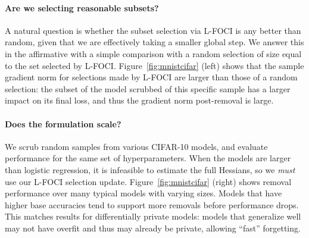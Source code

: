 \paragraph{Are we selecting reasonable subsets?} A natural question is whether the subset selection via L-FOCI is any better than random, given that we are effectively taking a smaller global step. We answer this in the affirmative with a simple comparison with a random selection of size equal to the set selected by L-FOCI. Figure~\ref{fig:mnistcifar} (left) shows that the sample gradient norm for selections made by L-FOCI are larger than those of a random selection: the subset of the model scrubbed of this specific sample has a larger impact on its final loss, and thus the gradient norm post-removal is large.




\paragraph{Does the formulation scale?} We scrub random samples from various CIFAR-10 models, and evaluate  performance for the same set of hyperparameters. When the models are larger than logistic regression, it is infeasible to estimate the full Hessians, so 
we {\em must} use our L-FOCI selection update. Figure~\ref{fig:mnistcifar} (right) shows removal performance over many typical models with varying sizes. Models that have higher base accuracies tend to support more removals before performance drops. This matches results for differentially private models: models that generalize well may not have overfit and thus may already be private, allowing ``fast'' forgetting.

